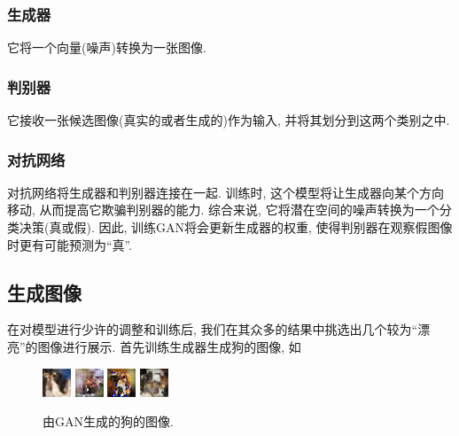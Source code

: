 \documentclass[lang=cn,11pt]{elegantpaper}
\begin{document}
\subsubsection*{生成器}
它将一个向量(噪声)转换为一张图像. 
\subsubsection*{判别器}
它接收一张候选图像(真实的或者生成的)作为输入, 并将其划分到这两个类别之中. 
\subsubsection*{对抗网络}
对抗网络将生成器和判别器连接在一起. 训练时, 这个模型将让生成器向某个方向移动, 从而提高它欺骗判别器的能力. 综合来说, 它将潜在空间的噪声转换为一个分
类决策(真或假). 因此, 训练GAN将会更新生成器的权重, 使得判别器在观察假图像时更有可能预测为“真”. 

\subsection{生成图像}
在对模型进行少许的调整和训练后, 我们在其众多的结果中挑选出几个较为“漂亮”的图像进行展示. 首先训练生成器生成狗的图像, 如 
\begin{figure}[htbp]
  \centering
  \includegraphics[width=.2\textwidth]{dog1}
  \includegraphics[width=.2\textwidth]{dog2}
  \includegraphics[width=.2\textwidth]{dog3}
  \includegraphics[width=.2\textwidth]{dog4}
  \caption{由GAN生成的狗的图像. \label{fig:dog}}
\end{figure}
\end{document}
